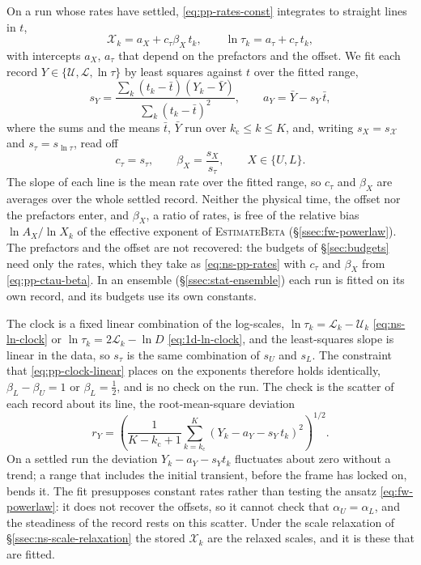 \documentclass{article}
\begin{document}
On a run whose rates have settled, \eqref{eq:pp-rates-const} integrates to
straight lines in $t$,
\begin{equation}\label{eq:pp-lines}
  \mathcal{X}_k = a_X + c_\tau \beta_X\, t_k ,
  \qquad
  \ln \tau_k = a_\tau + c_\tau\, t_k ,
\end{equation}
with intercepts $a_X$, $a_\tau$ that depend on the prefactors and the offset.
We fit each record $Y \in \{\mathcal{U}, \mathcal{L}, \ln \tau\}$ by least
squares against $t$ over the fitted range,
\begin{equation}\label{eq:pp-slope}
  s_Y = \frac{\sum_k (t_k - \bar t)(Y_k - \bar Y)}{\sum_k (t_k - \bar t)^2},
  \qquad
  a_Y = \bar Y - s_Y\, \bar t,
\end{equation}
where the sums and the means $\bar t$, $\bar Y$ run over
$k_{\mathrm{c}} \le k \le K$, and, writing $s_X = s_{\mathcal{X}}$ and
$s_\tau = s_{\ln \tau}$, read off
\begin{equation}\label{eq:pp-ctau-beta}
  c_\tau = s_\tau, \qquad \beta_X = \frac{s_X}{s_\tau}, \qquad X \in \{U, L\}.
\end{equation}
The slope of each line is the mean rate over the fitted range, so $c_\tau$
and $\beta_X$ are averages over the whole settled record. Neither the
physical time, the offset nor the prefactors enter, and $\beta_X$, a ratio of
rates, is free of the relative bias $\ln A_X / \ln X_k$ of the effective
exponent of \textsc{EstimateBeta} (\S\ref{ssec:fw-powerlaw}). The prefactors
and the offset are not recovered: the budgets of \S\ref{sec:budgets} need
only the rates, which they take as \eqref{eq:ns-pp-rates} with $c_\tau$ and
$\beta_X$ from \eqref{eq:pp-ctau-beta}. In an ensemble
(\S\ref{ssec:stat-ensemble}) each run is fitted on its own record, and its
budgets use its own constants.

The clock is a fixed linear combination of the log-scales,
$\ln \tau_k = \mathcal{L}_k - \mathcal{U}_k$ \eqref{eq:ns-ln-clock} or
$\ln \tau_k = 2\mathcal{L}_k - \ln D$ \eqref{eq:1d-ln-clock}, and the
least-squares slope is linear in the data, so $s_\tau$ is the same
combination of $s_U$ and $s_L$. The constraint that \eqref{eq:pp-clock-linear}
places on the exponents therefore holds identically, $\beta_L - \beta_U = 1$
or $\beta_L = \tfrac12$, and is no check on the run. The check is the scatter
of each record about its line, the root-mean-square deviation
\begin{equation}\label{eq:pp-line-resid}
  r_Y = \left( \frac{1}{K - k_{\mathrm{c}} + 1} \sum_{k = k_{\mathrm{c}}}^{K}
        \left( Y_k - a_Y - s_Y\, t_k \right)^2 \right)^{1/2}.
\end{equation}
On a settled run the deviation $Y_k - a_Y - s_Y t_k$ fluctuates about zero
without a trend; a range that includes the initial transient, before the
frame has locked on, bends it. The fit presupposes constant rates rather than
testing the ansatz \eqref{eq:fw-powerlaw}: it does not recover the offsets,
so it cannot check that $\alpha_U = \alpha_L$, and the steadiness of the
record rests on this scatter. Under the scale relaxation of
\S\ref{ssec:ns-scale-relaxation} the stored $\mathcal{X}_k$ are the relaxed
scales, and it is these that are fitted.
\end{document}
